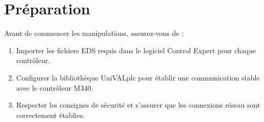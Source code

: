 
\section{Préparation}
Avant de commencer les manipulations, assurez-vous de :
\begin{enumerate}
    \item Importer les fichiers EDS requis dans le logiciel Control Expert pour chaque contrôleur.
    \item Configurer la bibliothèque UniVALplc pour établir une communication stable avec le contrôleur M340.
    \item Respecter les consignes de sécurité et s'assurer que les connexions réseau sont correctement établies.
\end{enumerate}
